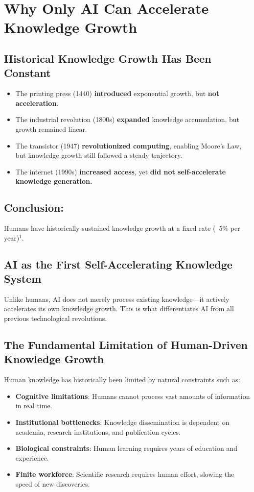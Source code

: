 \documentclass{article}
\begin{document}
\section{Why Only AI Can Accelerate Knowledge Growth}

\subsection{Historical Knowledge Growth Has Been Constant}

\begin{itemize}
\item  The printing press (1440) {\bf introduced} exponential growth, but {\bf not acceleration}.  
\item The industrial revolution (1800s) {\bf expanded} knowledge accumulation, but growth remained linear.
\item  The transistor (1947) {\bf revolutionized computing}, enabling Moore's Law, but knowledge growth still followed a steady trajectory.  
\item The internet (1990s) {\bf increased access}, yet {\bf did not self-accelerate knowledge generation.}  
\end{itemize}


\subsection*{Conclusion:} 
Humans have historically sustained knowledge growth at a fixed rate (~5\% per year)$^1$.  

\subsection{AI as the First Self-Accelerating Knowledge System}

Unlike humans, AI does not merely process existing knowledge---it actively accelerates its own knowledge growth. This is what differentiates AI from all previous technological revolutions.

\subsection*{The Fundamental Limitation of Human-Driven Knowledge Growth}

Human knowledge has historically been limited by natural constraints such as:

\begin{itemize}
\item  {\bf Cognitive limitations}: Humans cannot process vast amounts of information in real time.
\item {\bf Institutional bottlenecks}: Knowledge dissemination is dependent on academia, research institutions, and publication cycles.
\item  {\bf Biological constraints}: Human learning requires years of education and experience.
\item  {\bf Finite workforce}: Scientific research requires human effort, slowing the speed of new discoveries.
\end{itemize}
\end{document}
